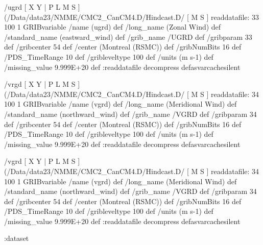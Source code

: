 \begin{ingrid}
/ugrd {
[ X Y | P L M S ]
(/Data/data23/NMME/CMC2_CanCM4.D/Hindcast.D/%
[ M S ]
readdatafile:
33 100 1 GRIBvariable 
/name (ugrd) def
/long_name (Zonal Wind) def
/standard_name (eastward_wind) def
/grib_name /UGRD def
/gribparam 33 def
/gribcenter 54 def
/center (Montreal (RSMC)) def
/gribNumBits 16 def
/PDS_TimeRange 10 def
/gribleveltype 100 def
/units (m s-1) def
/missing_value 9.999E+20 def
:readdatafile decompress
} defasvarcachesilent

/vrgd {
[ X Y | P L M S ]
(/Data/data23/NMME/CMC2_CanCM4.D/Hindcast.D/%
[ M S ]
readdatafile:
34 100 1 GRIBvariable 
/name (vgrd) def
/long_name (Meridional Wind) def
/standard_name (northward_wind) def
/grib_name /VGRD def
/gribparam 34 def
/gribcenter 54 def
/center (Montreal (RSMC)) def
/gribNumBits 16 def
/PDS_TimeRange 10 def
/gribleveltype 100 def
/units (m s-1) def
/missing_value 9.999E+20 def
:readdatafile decompress
} defasvarcachesilent

/vgrd {
[ X Y | P L M S ]
(/Data/data23/NMME/CMC2_CanCM4.D/Hindcast.D/%
[ M S ]
readdatafile:
34 100 1 GRIBvariable 
/name (vgrd) def
/long_name (Meridional Wind) def
/standard_name (northward_wind) def
/grib_name /VGRD def
/gribparam 34 def
/gribcenter 54 def
/center (Montreal (RSMC)) def
/gribNumBits 16 def
/PDS_TimeRange 10 def
/gribleveltype 100 def
/units (m s-1) def
/missing_value 9.999E+20 def
:readdatafile decompress
} defasvarcachesilent

:dataset
\end{ingrid}
